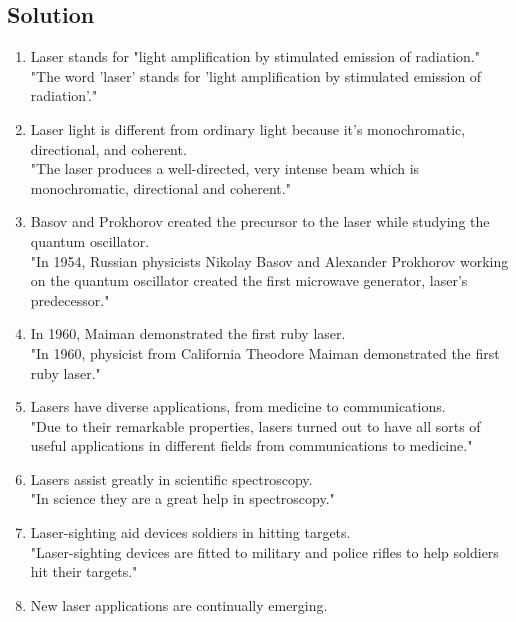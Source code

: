 \subsection*{Solution}
\begin{enumerate}
      \item Laser stands for "light amplification by stimulated emission of radiation." \\
            "The word 'laser' stands for 'light amplification by stimulated emission
            of radiation'." 
      \item Laser light is different from ordinary light because it's monochromatic,
            directional, and coherent. \\
            "The laser produces a well-directed, very intense beam which is
            monochromatic, directional and coherent." 
      \item Basov and Prokhorov created the precursor to the laser while studying the
            quantum oscillator. \\
            "In 1954, Russian physicists Nikolay Basov and Alexander Prokhorov working
            on the quantum oscillator created the first microwave generator, laser’s
            predecessor." 
      \item In 1960, Maiman demonstrated the first ruby laser. \\
            "In 1960, physicist from California Theodore Maiman demonstrated the first
            ruby laser." 
      \item Lasers have diverse applications, from medicine to communications. \\
            "Due to their remarkable properties, lasers turned out to have all sorts
            of useful applications in different fields from communications to medicine."
      \item Lasers assist greatly in scientific spectroscopy. \\
            "In science they are a great help in spectroscopy."
      \item Laser-sighting aid devices soldiers in hitting targets. \\
            "Laser-sighting devices are fitted to military and police rifles to help
            soldiers hit their targets." 
      \item New laser applications are continually emerging. \\

\end{enumerate}
